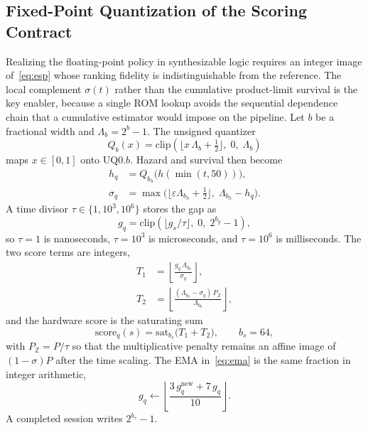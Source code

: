 \subsection{Fixed-Point Quantization of the Scoring Contract}
\label{sec:quant}

Realizing the floating-point policy in synthesizable logic requires an
integer image of~\eqref{eq:esp} whose ranking fidelity is
indistinguishable from the reference. The local complement
$\sigma(t)$ rather than the cumulative product-limit survival is the
key enabler, because a single ROM lookup avoids the sequential
dependence chain that a cumulative estimator would impose on the
pipeline. Let $b$ be a fractional width and $\Lambda_b=2^{b}-1$.
The unsigned quantizer
\begin{equation}
  Q_{b}(x)
  =\mathrm{clip}\!\left(
      \bigl\lfloor x\,\Lambda_b+\tfrac12\bigr\rfloor,\;
      0,\;\Lambda_b
    \right)
  \label{eq:uq}
\end{equation}
maps $x\in[0,1]$ onto $\mathrm{UQ}0.b$. Hazard and survival then
become
\begin{align}
  h_{q}
  &=Q_{b_{h}}\!\bigl(h(\min(t,50))\bigr),
  \label{eq:hq}
  \\
  \sigma_{q}
  &=\max\!\bigl(
      \bigl\lfloor\varepsilon\Lambda_{b_{h}}+\tfrac12\bigr\rfloor,\;
      \Lambda_{b_{h}}-h_{q}
    \bigr).
  \label{eq:survq}
\end{align}
A time divisor $\tau\in\{1,10^{3},10^{6}\}$ stores the gap as
\begin{equation}
  g_{q}
  =\mathrm{clip}\!\left(
      \bigl\lfloor g_s/\tau\bigr\rfloor,\;
      0,\;2^{b_{g}}-1
    \right),
  \label{eq:gapq}
\end{equation}
so $\tau=1$ is nanoseconds, $\tau=10^{3}$ is microseconds, and
$\tau=10^{6}$ is milliseconds. The two score terms are integers,
\begin{align}
  T_{1}
  &=\left\lfloor
      \frac{g_{q}\,\Lambda_{b_{h}}}{\sigma_{q}}
    \right\rfloor,
  \label{eq:t1}
  \\
  T_{2}
  &=\left\lfloor
      \frac{(\Lambda_{b_{h}}-\sigma_{q})\,P_{\mathbb{Z}}}
           {\Lambda_{b_{h}}}
    \right\rfloor,
  \label{eq:t2}
\end{align}
and the hardware score is the saturating sum
\begin{equation}
  \mathrm{score}_{q}(s)
  =\mathrm{sat}_{b_{s}}\!\bigl(T_{1}+T_{2}\bigr),
  \qquad
  b_{s}=64,
  \label{eq:scoreq}
\end{equation}
with $P_{\mathbb{Z}}=P/\tau$ so that the multiplicative penalty
remains an affine image of $(1-\sigma)P$ after the time scaling. The
EMA in~\eqref{eq:ema} is the same fraction in integer arithmetic,
\begin{equation}
  g_{q}
  \leftarrow
  \left\lfloor
    \frac{3\,g_{q}^{\mathrm{new}}+7\,g_{q}}{10}
  \right\rfloor.
  \label{eq:ema-int}
\end{equation}
A completed session writes $2^{b_{s}}-1$.

